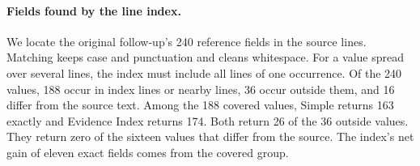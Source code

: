 \paragraph{Fields found by the line index.}

We locate the original follow-up's 240 reference fields in the source lines.
Matching keeps case and punctuation and cleans whitespace.
For a value spread over several lines, the index must include all lines of
one occurrence. Of the 240 values, 188 occur in index lines or nearby lines,
36 occur outside them, and 16 differ from the source text.
Among the 188 covered values, Simple returns 163 exactly and Evidence Index
returns 174. Both return 26 of the 36 outside values.
They return zero of the sixteen values that differ from the source.
The index's net gain of eleven exact fields comes from the covered group.

